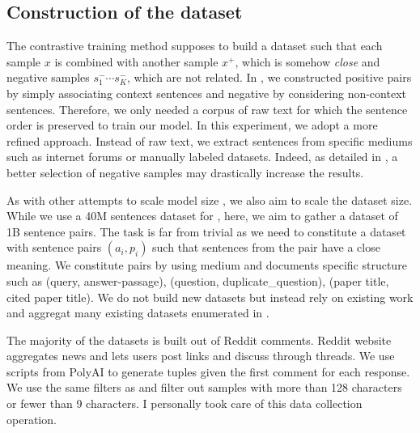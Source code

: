 \subsection{Construction of the dataset}

The contrastive training method supposes to build a dataset such that each sample $x$ is combined with another sample $x^+$, which is somehow \textit{close} and negative samples $s^-_1 \cdots s^-_K$, which are not related. In , we constructed positive pairs by simply associating context sentences and negative by considering non-context sentences. Therefore, we only needed a corpus of raw text for which the sentence order is preserved to train our model. In this experiment, we adopt a more refined approach. Instead of raw text, we extract sentences from specific mediums such as internet forums or manually labeled datasets. Indeed, as detailed in , a better selection of negative samples may drastically increase the results.

As with other attempts to scale model size \parencite{liu_2019, radford_2019, brown_20}, we also aim to scale the dataset size. While we use a 40M sentences dataset for \textcite{simoulin_2021a}, here, we aim to gather a dataset of 1B sentence pairs. The task is far from trivial as we need to constitute a dataset with sentence pairs $(a_i, p_i)$ such that sentences from the pair have a close meaning. We constitute pairs by using  medium and documents specific structure such as (query, answer-passage), (question, duplicate\_question), (paper title, cited paper title). We do not build new datasets but instead rely on existing work and aggregat many existing datasets enumerated in .

The majority of the datasets is built out of Reddit comments. Reddit website aggregates news and lets users post links and discuss through threads. We use scripts from PolyAI to generate tuples given the first comment for each response. We use the same filters as \textcite{henderson_2019} and filter out samples with more than 128 characters or fewer than 9 characters. I personally took care of this data collection operation.

